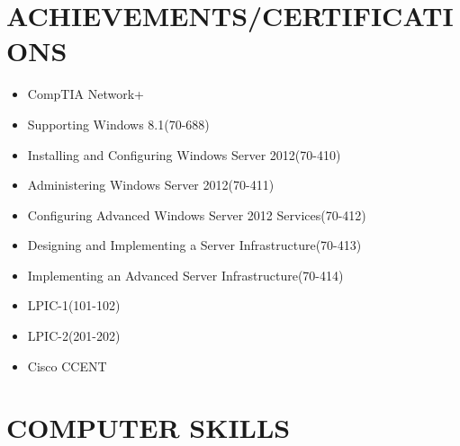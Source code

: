 \documentclass{res}
\begin{document}
\begin{resume}
	\section{ACHIEVEMENTS/CERTIFICATIONS}
	
	\begin{itemize}
		\item{CompTIA Network+}
		\item{Supporting Windows 8.1(70-688)}
		\item{Installing and Configuring Windows Server 2012(70-410)}
		\item{Administering Windows Server 2012(70-411)}
		\item{Configuring Advanced Windows Server 2012 Services(70-412)}
		\item{Designing and Implementing a Server Infrastructure(70-413)}
		\item{Implementing an Advanced Server Infrastructure(70-414)}
		\item{LPIC-1(101-102)}
		\item{LPIC-2(201-202)}
		\item{Cisco CCENT}		
	\end{itemize}
	
	\section{COMPUTER SKILLS}
	

\end{resume}
\end{document}

